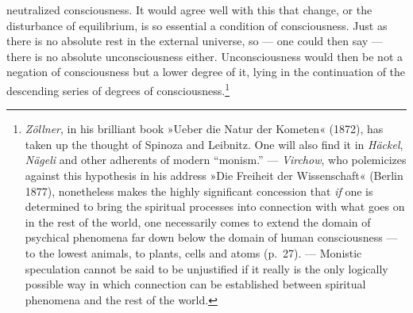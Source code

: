 \documentclass[12pt,a4paper]{book}
\begin{document}
neutralized consciousness. It would agree well with this that change, or
the disturbance of equilibrium, is so essential a condition of
consciousness. Just as there is no absolute rest in the external
universe, so --- one could then say --- there is no absolute
unconsciousness either. Unconsciousness would then be not a negation of
consciousness but a lower degree of it, lying in the continuation of the
descending
series of degrees of consciousness.\footnote{\emph{Zöllner}, in his
brilliant book »Ueber die Natur der Kometen« (1872), has taken up the
thought of Spinoza and Leibnitz. One will also find it in \emph{Häckel},
\emph{Nägeli} and other adherents of modern ``monism.'' ---
\emph{Virchow}, who polemicizes against this hypothesis in his address
»Die Freiheit der Wissenschaft« (Berlin 1877), nonetheless makes the
highly significant concession that \emph{if} one is determined to bring
the spiritual processes into connection with what goes on in the rest of
the world, one necessarily comes to extend the domain of psychical
phenomena far down below the domain of human consciousness --- to the
lowest animals, to plants, cells and atoms (p.~27). --- Monistic
speculation cannot be said to be unjustified if it really is the only
logically possible way in which connection can be established between
spiritual phenomena and the rest of the world.}
\end{document}
